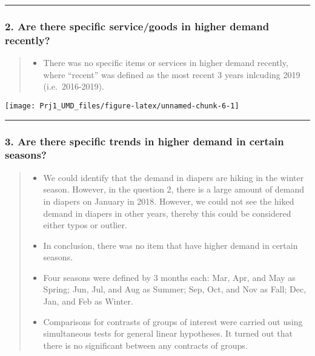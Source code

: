 \documentclass[]{article}
\providecommand{\tightlist}{%
  \setlength{\itemsep}{0pt}\setlength{\parskip}{0pt}}
\begin{document}
\begin{center}\rule{0.5\linewidth}{\linethickness}\end{center}

\hypertarget{are-there-specific-servicegoods-in-higher-demand-recently}{%
\subsubsection{2. Are there specific service/goods in higher demand
recently?}\label{are-there-specific-servicegoods-in-higher-demand-recently}}

\begin{quote}
\begin{itemize}
\tightlist
\item
  There was no specific items or services in higher demand recently,
  where ``recent'' was defined as the most recent 3 years inlcuding 2019
  (i.e.~2016-2019).
\end{itemize}
\end{quote}

\begin{center}\texttt{[image: Prj1\_UMD\_files/figure-latex/unnamed-chunk-6-1]} \end{center}

\begin{center}\rule{0.5\linewidth}{\linethickness}\end{center}

\hypertarget{are-there-specific-trends-in-higher-demand-in-certain-seasons}{%
\subsubsection{3. Are there specific trends in higher demand in certain
seasons?}\label{are-there-specific-trends-in-higher-demand-in-certain-seasons}}

\begin{quote}
\begin{itemize}
\tightlist
\item
  We could identify that the demand in diapers are hiking in the winter
  season. However, in the question 2, there is a large amount of demand
  in diapers on January in 2018. However, we could not see the hiked
  demand in diapers in other years, thereby this could be considered
  either typos or outlier.
\item
  In conclusion, there was no item that have higher demand in certain
  seasons.
\item
  Four seasons were defined by 3 months each: Mar, Apr, and May as
  Spring; Jun, Jul, and Aug as Summer; Sep, Oct, and Nov as Fall; Dec,
  Jan, and Feb as Winter.
\item
  Comparisons for contrasts of groups of interest were carried out using
  simultaneous tests for general linear hypotheses. It turned out that
  there is no significant between any contracts of groups.
\end{itemize}
\end{quote}
\end{document}
